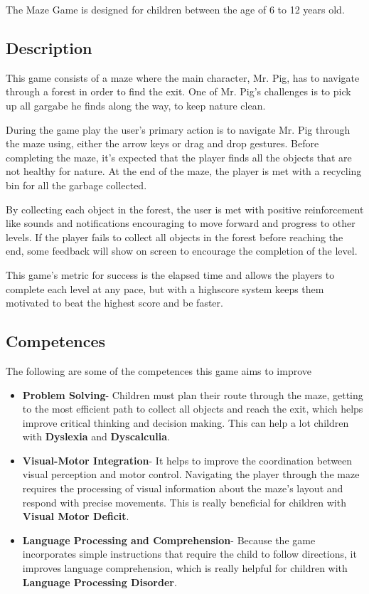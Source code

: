 The Maze Game is designed for children between the age of 6 to 12 years old.

\subsection*{Description}

This game consists of a maze where the main character, Mr. Pig, has to navigate through a forest in order to find the exit. One of Mr. Pig's challenges is to pick up all gargabe he finds along the way, to keep nature clean.

During the game play the user's primary action is to navigate Mr. Pig through the maze using, either the arrow keys or drag and drop gestures. Before completing the maze, it's expected that the player finds all the objects that are not healthy for nature.
At the end of the maze, the player is met with a recycling bin for all the garbage collected.

By collecting each object in the forest, the user is met with positive reinforcement like sounds and notifications encouraging to move forward and progress to other levels. If the player fails to collect all objects in the forest before reaching the end, some feedback will show on screen to encourage the completion of the level.

This game's metric for success is the elapsed time and allows the players to complete each level at any pace, but with a highscore system keeps them motivated to beat the highest score and be faster.

\subsection*{Competences}
The following are some of the competences this game aims to improve

\begin{itemize}
    \item \textbf{Problem Solving}- Children must plan their route through the maze, getting to the most efficient path to collect all objects and reach the exit, which helps improve critical thinking and decision making. This can help a lot children with \textbf{Dyslexia} and \textbf{Dyscalculia}.

    \item \textbf{Visual-Motor Integration}- It helps to improve the coordination between visual perception and motor control. Navigating the player through the maze requires the processing of visual information about the maze's layout and respond with precise movements. This is really beneficial for children with \textbf{Visual Motor Deficit}.
    
    \item \textbf{Language Processing and Comprehension}- Because the game incorporates simple instructions that require the child to follow directions, it improves language comprehension, which is really helpful for children with \textbf{Language Processing Disorder}.
    
\end{itemize}

